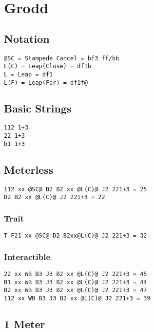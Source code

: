 \documentclass[main.tex]{subfiles}
\begin{document}
\chapter{Grodd}

\section{Notation}
\begin{lstlisting}[language=FG]
@SC = Stampede Cancel = bf3 ff/bb
L(C) = Leap(Close) = df1b
L = Leap = df1
L(F) = Leap(Far) = df1f@
\end{lstlisting}

\section{Basic Strings}

\begin{lstlisting}[language=FG]
112 1+3
22 1+3
b1 1+3
\end{lstlisting}

\section{Meterless}


\begin{lstlisting}[language=FG]
112 xx @SC@ D2 B2 xx @L(C)@ J2 221+3 = 25
D2 B2 xx @L(C)@ J2 221+3 = 22
\end{lstlisting}

\subsection{Trait}

\begin{lstlisting}[language=FG]
T F21 xx @SC@ D2 B2xx@L(C)@ J2 221+3 = 32
\end{lstlisting}


\subsection{Interactible}
\begin{lstlisting}[language=FG]
22 xx WB B3 J3 B2 xx @L(C)@ J2 221+3 = 45
B1 xx WB B3 J3 B2 xx @L(C)@ J2 221+3 = 44
B2 xx WB B3 J3 B2 xx @L(C)@ J2 221+3 = 47
112 xx WB B3 J3 B2 xx @L(C)@ J2 221+3 = 39
\end{lstlisting}

\section{1 Meter}
\end{document}
